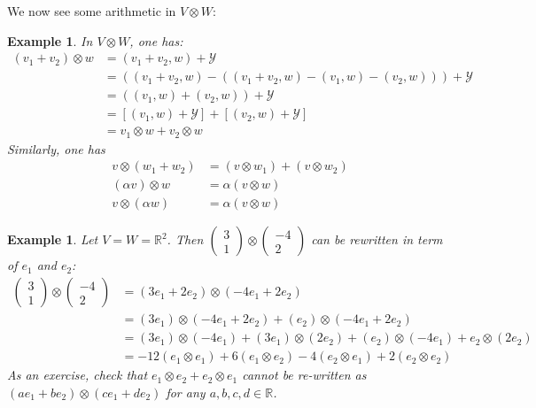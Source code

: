 \documentclass[12pt]{amsbook}
\newtheorem{example}[theorem]{Example}
\begin{document}
We now see some arithmetic in $V \otimes W$:
\begin{example} \label{eg-tensorarith} 
In $V \otimes W$, one has:
\begin{align*}
(v_1 + v_2) \otimes w &= (v_1 + v_2,w) + \mathcal{Y}\\
&= ((v_1 + v_2,w) - ((v_1 + v_2,w) - (v_1,w) - (v_2,w))) + \mathcal{Y} \\
&= ((v_1,w) + (v_2,w)) + \mathcal{Y}\\
&= [(v_1,w) + \mathcal{Y}] + [(v_2,w) + \mathcal{Y}]\\
&= v_1 \otimes w + v_2 \otimes w
\end{align*}
Similarly, one has
\begin{align*}
v \otimes (w_1 + w_2) &= (v \otimes w_1) + (v \otimes w_2)\\
(\alpha v) \otimes w &= \alpha (v \otimes w)\\
v \otimes (\alpha w) &= \alpha (v \otimes w)    
\end{align*}
\end{example}

\begin{example} Let $V =W = \mathbb{R}^2$. Then $\begin{pmatrix} 3\\ 1\end{pmatrix} \otimes \begin{pmatrix} -4 \\ 2 \end{pmatrix}$ can be rewritten in term of $e_1$ and $e_2$:
\begin{align*}
\begin{pmatrix} 3\\ 1\end{pmatrix} \otimes \begin{pmatrix} -4 \\ 2 \end{pmatrix} &= (3e_1 + 2e_2) \otimes (-4e_1 + 2e_2) \\
&= (3e_1) \otimes (-4e_1 + 2e_2) + (e_2) \otimes (-4e_1 + 2e_2) \\
&= (3e_1) \otimes (-4e_1) + (3e_1) \otimes (2e_2) + (e_2) \otimes (-4e_1) + e_2 \otimes (2e_2)\\
&= -12(e_1 \otimes e_1) + 6(e_1 \otimes e_2) - 4(e_2 \otimes e_1) + 2(e_2 \otimes e_2)
\end{align*}
As an exercise, check that $e_1 \otimes e_2 + e_2 \otimes e_1$ cannot be re-written as $(ae_1 + be_2) \otimes (ce_1 + de_2)$ for any $a, b, c, d \in \mathbb{R}$.
\end{example}
\end{document}
